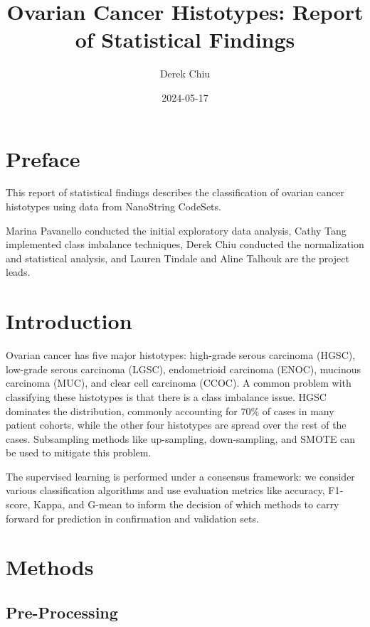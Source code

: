 \documentclass[
]{report}
\title{Ovarian Cancer Histotypes: Report of Statistical Findings}
\author{Derek Chiu}
\date{2024-05-17}
\begin{document}
\maketitle

{
\hypersetup{linkcolor=}
\setcounter{tocdepth}{1}
\tableofcontents
}
\listoffigures
\listoftables
\chapter*{Preface}\label{preface}

This report of statistical findings describes the classification of ovarian cancer histotypes using data from NanoString CodeSets.

Marina Pavanello conducted the initial exploratory data analysis, Cathy Tang implemented class imbalance techniques, Derek Chiu conducted the normalization and statistical analysis, and Lauren Tindale and Aline Talhouk are the project leads.

\chapter{Introduction}\label{introduction}

Ovarian cancer has five major histotypes: high-grade serous carcinoma (HGSC), low-grade serous carcinoma (LGSC), endometrioid carcinoma (ENOC), mucinous carcinoma (MUC), and clear cell carcinoma (CCOC). A common problem with classifying these histotypes is that there is a class imbalance issue. HGSC dominates the distribution, commonly accounting for 70\% of cases in many patient cohorts, while the other four histotypes are spread over the rest of the cases. Subsampling methods like up-sampling, down-sampling, and SMOTE can be used to mitigate this problem.

The supervised learning is performed under a consensus framework: we consider various classification algorithms and use evaluation metrics like accuracy, F1-score, Kappa, and G-mean to inform the decision of which methods to carry forward for prediction in confirmation and validation sets.

\chapter{Methods}\label{methods}

\section{Pre-Processing}\label{pre-processing}
\end{document}
